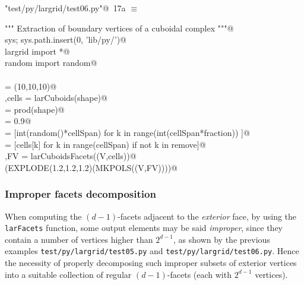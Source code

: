 \documentclass[11pt,oneside]{article}	%
\begin{document}
\begin{flushleft} \small \label{scrap25}
\protect{}\verb@"test/py/largrid/test06.py"@\nobreak\ {\footnotesize 17a }$\equiv$
\vspace{-1ex}
\begin{list}{}{} \item
\mbox{}\verb@""" Extraction of boundary vertices of a cuboidal complex """@\\
\mbox{}\verb@import sys; sys.path.insert(0, 'lib/py/')@\\
\mbox{}\verb@from largrid import *@\\
\mbox{}\verb@from random import random@\\
\mbox{}\verb@@\\
\mbox{}\verb@shape = (10,10,10)@\\
\mbox{}\verb@V,cells = larCuboids(shape)@\\
\mbox{}\verb@cellSpan = prod(shape)@\\
\mbox{}\verb@fraction = 0.9@\\
\mbox{}\verb@remove = [int(random()*cellSpan) for k in range(int(cellSpan*fraction)) ]@\\
\mbox{}\verb@cells = [cells[k] for k in range(cellSpan) if not k in remove]@\\
\mbox{}\verb@V,FV = larCuboidsFacets((V,cells))@\\
\mbox{}\verb@VIEW(EXPLODE(1.2,1.2,1.2)(MKPOLS((V,FV))))@\\
\mbox{}\verb@@{\NWsep}
\end{list}
\vspace{-2ex}
\end{flushleft}



\subsubsection{Improper facets decomposition}

When computing the $(d-1)$-facets adjacent to the \emph{exterior} face, by using the \texttt{larFacets} function, some output elements may be said \emph{improper}, since they contain a number of vertices higher than $2^{d-1}$, as shown by the previous examples 
\texttt{test/py/largrid/test05.py} and \texttt{test/py/largrid/test06.py}. Hence the necessity of properly decomposing such improper subsets of exterior vertices into a suitable collection of regular $(d-1)$-facets (each with $2^{d-1}$ vertices).
\end{document}
